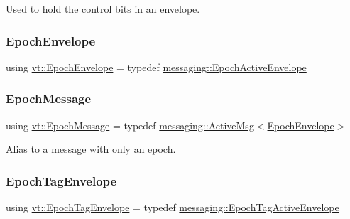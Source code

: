 Used to hold the control bits in an envelope. 

\mbox{\label{namespacevt_af71a025689a3da5037785b53a7a8e78c}} 
\subsubsection{\texorpdfstring{Epoch\+Envelope}{EpochEnvelope}}
{\footnotesize\ttfamily using \hyperlink{namespacevt_af71a025689a3da5037785b53a7a8e78c}{vt\+::\+Epoch\+Envelope} = typedef \hyperlink{structvt_1_1messaging_1_1_epoch_active_envelope}{messaging\+::\+Epoch\+Active\+Envelope}}

\mbox{\label{namespacevt_ad67368ffae52d7325002586b41bb150e}} 
\subsubsection{\texorpdfstring{Epoch\+Message}{EpochMessage}}
{\footnotesize\ttfamily using \hyperlink{namespacevt_ad67368ffae52d7325002586b41bb150e}{vt\+::\+Epoch\+Message} = typedef \hyperlink{structvt_1_1messaging_1_1_active_msg}{messaging\+::\+Active\+Msg}$<$\hyperlink{namespacevt_af71a025689a3da5037785b53a7a8e78c}{Epoch\+Envelope}$>$}



Alias to a message with only an epoch. 

\mbox{\label{namespacevt_af23b58014ced6898422213a0e5e6a27a}} 
\subsubsection{\texorpdfstring{Epoch\+Tag\+Envelope}{EpochTagEnvelope}}
{\footnotesize\ttfamily using \hyperlink{namespacevt_af23b58014ced6898422213a0e5e6a27a}{vt\+::\+Epoch\+Tag\+Envelope} = typedef \hyperlink{structvt_1_1messaging_1_1_epoch_tag_active_envelope}{messaging\+::\+Epoch\+Tag\+Active\+Envelope}}

\mbox{\label{namespacevt_a4ccc13b06bff8a4a35426a1a082a95a9}} 
